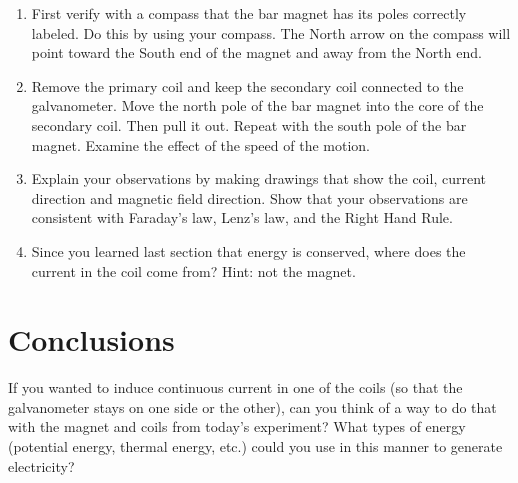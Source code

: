 \begin{enumerate}[resume]
	 \item First verify with a compass that the bar magnet has its poles correctly labeled.  Do this by using your compass.  The North arrow on the compass will point toward the South end of the magnet and away from the North end.
	\item  Remove the primary coil and keep the secondary coil connected to the galvanometer.  Move the north pole of the bar magnet into the core of the secondary coil.  Then pull it out.  Repeat with the south pole of the bar magnet.  Examine the effect of the speed of the motion.  
	\item Explain your observations by making drawings that show the coil, current direction and magnetic field direction.  Show that your observations are consistent with Faraday's law, Lenz's law, and the Right Hand Rule.
	\item Since you learned last section that energy is conserved, where does the current in the coil come from?  Hint: not the magnet.
\end{enumerate}

\section{Conclusions}
If you wanted to induce continuous current in one of the coils (so that the galvanometer stays on one side or the other), can you think of a way to do that with the magnet and coils from today's experiment?  What types of energy (potential energy, thermal energy, etc.) could you use in this manner to generate electricity?
 

\endinput